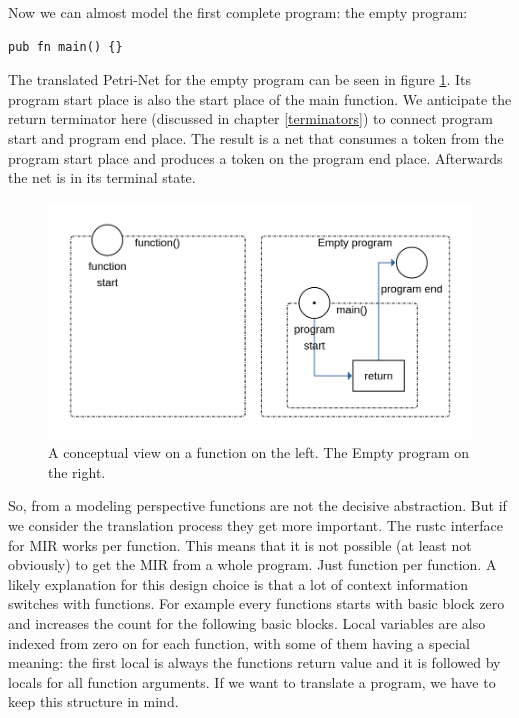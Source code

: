 Now we can almost model the first complete program: the empty program:
\begin{lstlisting}
pub fn main() {}
\end{lstlisting}
The translated Petri-Net for the empty program can be seen in figure \ref{basic_program}.
Its program start place is also the start place of the main function.
We anticipate the return terminator here (discussed in chapter \ref{terminators}) to connect program start and program end place.
The result is a net that consumes a token from the program start place and produces a token on the program end place.
Afterwards the net is in its terminal state.

\begin{figure}
    \centering
    \includegraphics[width=.7\textwidth]{../diagrams/function_and_empty_program.png}
    \caption{
        A conceptual view on a function on the left. The Empty program on the right.
    }
    \label{basic_program}
\end{figure}

So, from a modeling perspective functions are not the decisive abstraction.
But if we consider the translation process they get more important.
The rustc interface for MIR works per function.
This means that it is not possible (at least not obviously) to get the MIR from a whole program.
Just function per function.
A likely explanation for this design choice is that a lot of context information switches with functions.
For example every functions starts with basic block zero and increases the count for the following basic blocks.
Local variables are also indexed from zero on for each function, with some of them having a special meaning:
the first local is always the functions return value and it is followed by locals for all function arguments.
If we want to translate a program, we have to keep this structure in mind.

